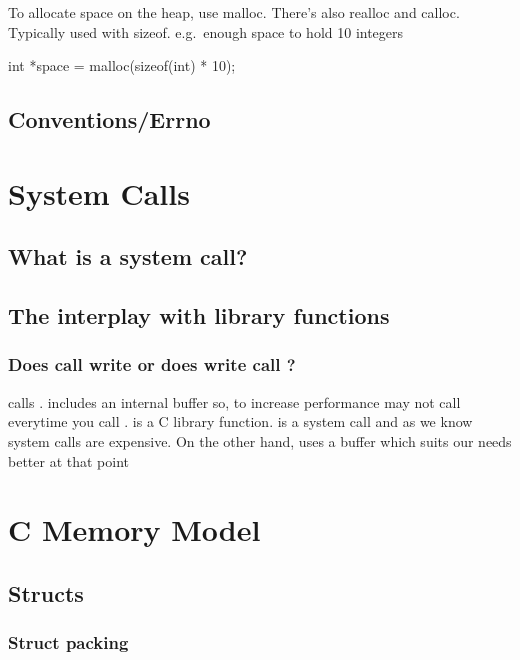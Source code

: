 To allocate space on the heap, use malloc. There's also realloc and calloc. Typically used with sizeof. e.g.~enough space to hold 10 integers

\begin{code}[language=C]
int *space = malloc(sizeof(int) * 10);
\end{code}

\subsection{Conventions/Errno}

\section{System Calls}

\subsection{What is a system call?}

\subsection{The interplay with library functions}

\subsubsection{Does  call write or does write call ?}

 calls .  includes an
internal buffer so, to increase performance  may not call
 everytime you call .  is a
C library function.  is a system call and as we know
system calls are expensive. On the other hand,  uses a
buffer which suits our needs better at that point

\section{C Memory Model}

\subsection{Structs}

\subsubsection{Struct packing}

